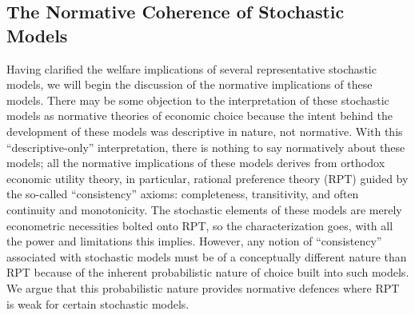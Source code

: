 \subsection{The Normative Coherence of Stochastic Models}

Having clarified the welfare implications of several representative stochastic models, we will begin the discussion of the normative implications of these models.
There may be some objection to the interpretation of these stochastic models as normative theories of economic choice because the intent behind the development of these models was descriptive in nature, not normative.
With this \enquote{descriptive-only} interpretation, there is nothing to say normatively about these models;
all the normative implications of these models derives from orthodox economic utility theory, in particular, rational preference theory (RPT) guided by the so-called \enquote{consistency}{\footnotemark} axioms: completeness, transitivity, and often{\footnotemark} continuity and monotonicity.
The stochastic elements of these models are merely econometric necessities bolted onto RPT, so the characterization goes, with all the power and limitations this implies.
However, any notion of \enquote{consistency} associated with stochastic models must be of a conceptually different nature than RPT because of the inherent probabilistic nature of choice built into such models.
We argue that this probabilistic nature provides normative defences where RPT is weak for certain stochastic models.

\addtocounter{footnote}{-2}


